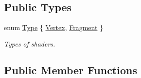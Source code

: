 \subsection*{Public Types}
\begin{DoxyCompactItemize}
\item 
enum \hyperlink{classsf_1_1_shader_afaa1aa65e5de37b74d047da9def9f9b3}{Type} \{ \hyperlink{classsf_1_1_shader_afaa1aa65e5de37b74d047da9def9f9b3a8718008f827eb32e29bbdd1791c62dce}{Vertex}, 
\hyperlink{classsf_1_1_shader_afaa1aa65e5de37b74d047da9def9f9b3ace6e88eec3a56b2e55ee3c8e64e9b89a}{Fragment}
 \}
\begin{DoxyCompactList}\small\item\em Types of shaders. \end{DoxyCompactList}\end{DoxyCompactItemize}
\subsection*{Public Member Functions}
